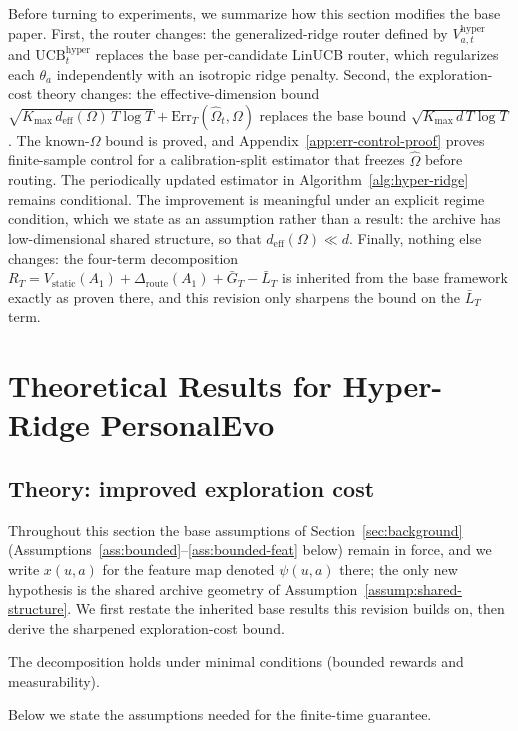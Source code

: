 \documentclass{article} %
\providecommand{\Rstatic}{V_{\mathrm{static}}}
\providecommand{\Droute}{\Delta_{\mathrm{route}}}
\providecommand{\deff}{d_{\mathrm{eff}}}
\providecommand{\Err}{\mathrm{Err}}
\providecommand{\Kmax}{K_{\max}}
\begin{document}
Before turning to experiments, we summarize how this section modifies the base
paper. First, the router changes: the generalized-ridge router defined by
$V_{a,t}^{\mathrm{hyper}}$ and $\mathrm{UCB}_t^{\mathrm{hyper}}$ replaces the
base per-candidate LinUCB router, which regularizes each $\theta_a$
independently with an isotropic ridge penalty. Second, the exploration-cost
theory changes: the effective-dimension bound
$\sqrt{\Kmax\, \deff(\Omega)\, T \log T} + \Err_T(\widehat{\Omega}_t, \Omega)$
replaces the base bound $\sqrt{\Kmax\, d\, T \log T}$. The known-$\Omega$
bound is proved, and Appendix~\ref{app:err-control-proof} proves finite-sample
control for a calibration-split estimator that freezes $\widehat{\Omega}$
before routing. The periodically updated estimator in
Algorithm~\ref{alg:hyper-ridge} remains conditional. The improvement is
meaningful under an explicit regime condition, which we state as an
assumption rather than a result: the archive has low-dimensional shared
structure, so that $\deff(\Omega) \ll d$. Finally, nothing else changes: the
four-term decomposition
$R_T = \Rstatic(A_1) + \Droute(A_1) + \bar{G}_T - \bar{L}_T$ is inherited from
the base framework exactly as proven there, and this revision only sharpens
the bound on the $\bar{L}_T$ term.

\section{Theoretical Results for Hyper-Ridge PersonalEvo}
\label{sec:hyper-theory}



\subsection{Theory: improved exploration cost}

\label{sec:method-assump}

Throughout this section the base assumptions of Section~\ref{sec:background} (Assumptions~\ref{ass:bounded}--\ref{ass:bounded-feat} below) remain in force, and we write $x(u,a)$ for the feature map denoted $\psi(u,a)$ there; the only new hypothesis is the shared archive geometry of Assumption~\ref{assump:shared-structure}. We first restate the inherited base results this revision builds on, then derive the sharpened exploration-cost bound.

The decomposition holds under minimal conditions (bounded rewards and measurability).

Below we state the assumptions needed for the finite-time guarantee.
\end{document}
